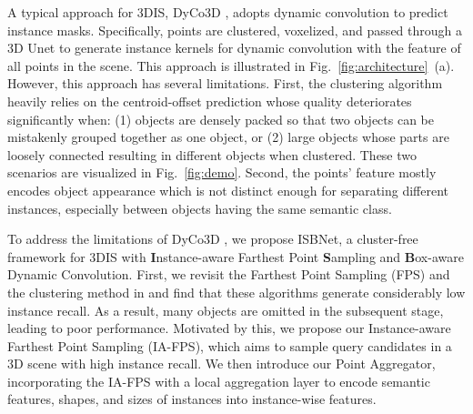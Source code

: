 \documentclass[10pt,twocolumn,letterpaper]{article}
\def\Approach{ISBNet}
\begin{document}
A typical approach for 3DIS, DyCo3D \cite{he2021dyco3d}, adopts dynamic convolution \cite{wang2020solov2, tian2020conditional} to predict instance masks. Specifically, points are clustered, voxelized, and passed through a 3D Unet to generate instance kernels for dynamic convolution with the feature of all points in the scene. This approach is illustrated in Fig.~\ref{fig:architecture}~(a). However, this approach has several limitations.
First, the clustering algorithm heavily relies on the centroid-offset prediction whose quality deteriorates significantly when:
(1) objects are densely packed so that two objects can be mistakenly grouped together as one object, or (2) large objects whose parts are loosely connected resulting in different objects when clustered. These two scenarios are visualized in Fig.~\ref{fig:demo}. 
Second, the points' feature mostly encodes object appearance which is not distinct enough for separating different instances, especially between objects having the same semantic class.






To address the limitations of DyCo3D \cite{he2021dyco3d}, we propose \Approach, a cluster-free framework for 3DIS with \textbf{I}nstance-aware Farthest Point \textbf{S}ampling and \textbf{B}ox-aware Dynamic Convolution.
First, we revisit the Farthest Point Sampling (FPS) \cite{eldar1997farthest} and the clustering method in \cite{he2021dyco3d,chen2021hierarchical,vu2022softgroup} and find that these algorithms generate considerably low instance recall. As a result, many objects are omitted in the subsequent stage, leading to poor performance. Motivated by this, we propose our Instance-aware Farthest Point Sampling (IA-FPS), which aims to sample query candidates in a 3D scene with high instance recall. We then introduce our Point Aggregator, incorporating the IA-FPS with a local aggregation layer to encode semantic features, shapes, and sizes of instances into instance-wise features. 
\end{document}
